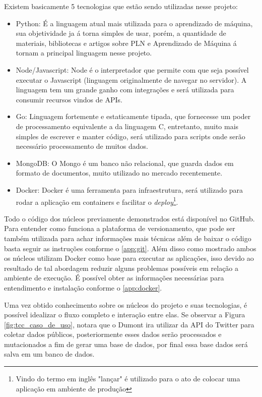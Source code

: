 Existem basicamente 5 tecnologias que estão sendo utilizadas nesse projeto:
\begin{itemize}
 \item Python: É a linguagem atual mais utilizada para o aprendizado de máquina, sua objetividade ja á torna simples de usar, porém, a quantidade de materiais, bibliotecas e artigos sobre PLN e Aprendizado de Máquina á tornam a principal linguagem nesse projeto.
 \item Node/Javascript: Node é o interpretador que permite com que seja possível executar o Javascript (linguagem originalmente de navegar no servidor). A linguagem tem um grande ganho com integrações e será utilizada para consumir recursos vindos de APIs.
 \item Go: Linguagem fortemente e estaticamente tipada, que fornecesse um poder de processamento equivalente a da linguagem C, entretanto, muito mais simples de escrever e manter código, será utilizado para scripts onde serão necessário processamento de muitos dados.
 \item MongoDB: O Mongo é um banco não relacional, que guarda dados em formato de documentos, muito utilizado no mercado recentemente.
 \item Docker: Docker é uma ferramenta para infraestrutura, será utilizado para rodar a aplicação em containers e facilitar o \textit{deploy}\footnote{Vindo do termo em inglês "lançar" é utilizado para o ato de colocar uma aplicação em ambiente de produção}.
\end{itemize}

Todo o código dos núcleos previamente demonstrados está disponível no GitHub. Para entender como funciona a plataforma de versionamento, que pode ser também utilizada para achar informações mais técnicas além de baixar o código basta seguir as instruções conforme o \autoref{app:git}. Além disso como mostrado ambos os núcleos utilizam Docker como base para executar as aplicações, isso devido ao resultado de tal abordagem reduzir alguns problemas possíveis em relação a ambiente de execução. É possível obter as informações necessárias para entendimento e instalação conforme o \autoref{app:docker}.

Uma vez obtido conhecimento sobre os núcleos do projeto e suas tecnologias, é possível idealizar o fluxo completo e interação entre elas. Se observar a Figura \ref{fig:tcc_caso_de_uso}, notara que o Dumont ira utilizar da API do Twitter para coletar dados públicos, posteriormente esses dados serão processados e mutacionados a fim de gerar uma base de dados, por final essa base dados será salva em um banco de dados.

